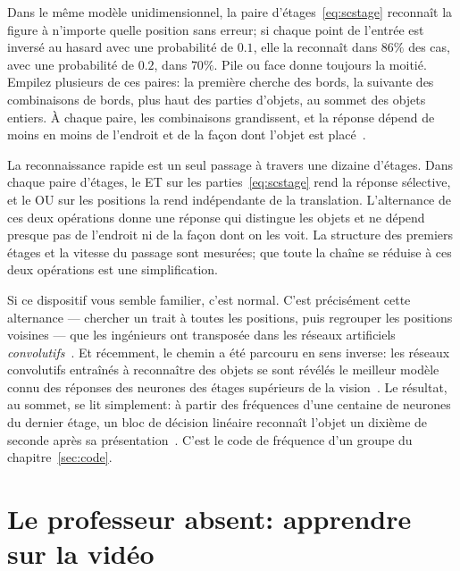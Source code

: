 Dans le même modèle unidimensionnel, la paire d'étages~\eqref{eq:scstage} reconnaît la figure à n'importe quelle position sans erreur; si chaque point de l'entrée est inversé au hasard avec une probabilité de $0.1$, elle la reconnaît dans $86\%$ des cas, avec une probabilité de $0.2$, dans $70\%$. Pile ou face donne toujours la moitié. Empilez plusieurs de ces paires: la première cherche des bords, la suivante des combinaisons de bords, plus haut des parties d'objets, au sommet des objets entiers. À chaque paire, les combinaisons grandissent, et la réponse dépend de moins en moins de l'endroit et de la façon dont l'objet est placé~\cite{Riesenhuber1999}.

\begin{keyblock}
\begin{proposition}
\label{prop:conveyor}
La reconnaissance rapide est un seul passage à travers une dizaine d'étages. Dans chaque paire d'étages, le ET sur les parties~\eqref{eq:scstage} rend la réponse sélective, et le OU sur les positions la rend indépendante de la translation. L'alternance de ces deux opérations donne une réponse qui distingue les objets et ne dépend presque pas de l'endroit ni de la façon dont on les voit. La structure des premiers étages et la vitesse du passage sont mesurées; que toute la chaîne se réduise à ces deux opérations est une simplification.
\end{proposition}
\end{keyblock}

Si ce dispositif vous semble familier, c'est normal. C'est précisément cette alternance --- chercher un trait à toutes les positions, puis regrouper les positions voisines --- que les ingénieurs ont transposée dans les réseaux artificiels \emph{convolutifs}~\cite{Fukushima1980}. Et récemment, le chemin a été parcouru en sens inverse: les réseaux convolutifs entraînés à reconnaître des objets se sont révélés le meilleur modèle connu des réponses des neurones des étages supérieurs de la vision~\cite{Yamins2014}. Le résultat, au sommet, se lit simplement: à partir des fréquences d'une centaine de neurones du dernier étage, un bloc de décision linéaire reconnaît l'objet un dixième de seconde après sa présentation~\cite{Hung2005}. C'est le code de fréquence d'un groupe du chapitre~\ref{sec:code}.

\section{Le professeur absent: apprendre sur la vidéo}

